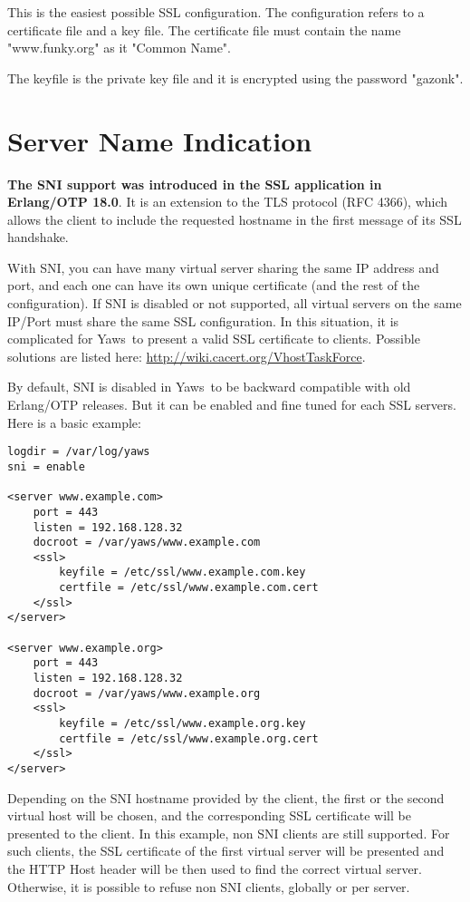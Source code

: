 \documentclass[11pt,oneside,english]{book}
\newcommand{\Yaws}            %
        {{\sc Yaws}}
\begin{document}
This is the easiest possible SSL configuration. The configuration
refers to a certificate file and a key file. The certificate file
must contain the name "www.funky.org" as it "Common Name".

The keyfile is the private key file and it is encrypted using
the password "gazonk".


\section{Server Name Indication}

\textbf{The SNI support was introduced in the SSL application in
  Erlang/OTP 18.0}. It is an extension to the TLS protocol (RFC 4366),
which allows the client to include the requested hostname in the first
message of its SSL handshake.

With SNI, you can have many virtual server sharing the same IP address
and port, and each one can have its own unique certificate (and the rest
of the configuration). If SNI is disabled or not supported, all virtual
servers on the same IP/Port must share the same SSL configuration. In
this situation, it is complicated for \Yaws\ to present a valid SSL
certificate to clients. Possible solutions are listed here:
\url{http://wiki.cacert.org/VhostTaskForce}.

By default, SNI is disabled in \Yaws\ to be backward compatible with old
Erlang/OTP releases. But it can be enabled and fine tuned for each SSL
servers. Here is a basic example:


\begin{verbatim}
logdir = /var/log/yaws
sni = enable

<server www.example.com>
    port = 443
    listen = 192.168.128.32
    docroot = /var/yaws/www.example.com
    <ssl>
        keyfile = /etc/ssl/www.example.com.key
        certfile = /etc/ssl/www.example.com.cert
    </ssl>
</server>

<server www.example.org>
    port = 443
    listen = 192.168.128.32
    docroot = /var/yaws/www.example.org
    <ssl>
        keyfile = /etc/ssl/www.example.org.key
        certfile = /etc/ssl/www.example.org.cert
    </ssl>
</server>
\end{verbatim}

Depending on the SNI hostname provided by the client, the first or the
second virtual host will be chosen, and the corresponding SSL
certificate will be presented to the client. In this example, non SNI
clients are still supported. For such clients, the SSL certificate of
the first virtual server will be presented and the HTTP Host header will
be then used to find the correct virtual server. Otherwise, it is
possible to refuse non SNI clients, globally or per server.
\end{document}
